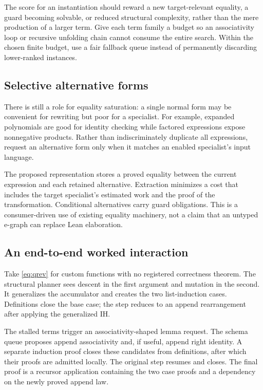 \documentclass[11pt,letterpaper]{article}
\theoremstyle{definition}\newtheorem{definition}[theorem]{Definition}
\theoremstyle{remark}\newtheorem{remark}[theorem]{Remark}
\begin{document}
The score for an instantiation should reward a new target-relevant equality, a guard becoming solvable, or reduced structural complexity, rather than the mere production of a larger term. Give each term family a budget so an associativity loop or recursive unfolding chain cannot consume the entire search. Within the chosen finite budget, use a fair fallback queue instead of permanently discarding lower-ranked instances.

\subsection{Selective alternative forms}
There is still a role for equality saturation: a single normal form may be convenient for rewriting but poor for a specialist. For example, expanded polynomials are good for identity checking while factored expressions expose nonnegative products. Rather than indiscriminately duplicate all expressions, request an alternative form only when it matches an enabled specialist's input language.

The proposed representation stores a proved equality between the current expression and each retained alternative. Extraction minimizes a cost that includes the target specialist's estimated work and the proof of the transformation. Conditional alternatives carry guard obligations. This is a consumer-driven use of existing equality machinery, not a claim that an untyped e-graph can replace Lean elaboration.

\subsection{An end-to-end worked interaction}
Take \eqref{eq:qrev} for custom functions with no registered correctness theorem. The structural planner sees descent in the first argument and mutation in the second. It generalizes the accumulator and creates the two list-induction cases. Definitions close the base case; the step reduces to an append rearrangement after applying the generalized IH.

The stalled terms trigger an associativity-shaped lemma request. The schema queue proposes append associativity and, if useful, append right identity. A separate induction proof closes these candidates from definitions, after which their proofs are admitted locally. The original step resumes and closes. The final proof is a recursor application containing the two case proofs and a dependency on the newly proved append law.
\end{document}
